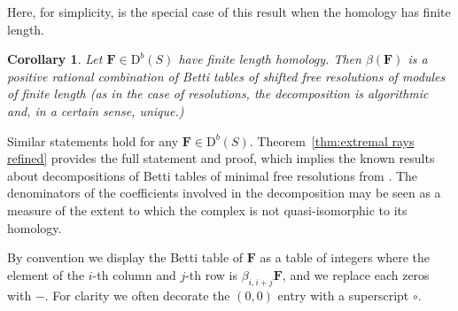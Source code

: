 \documentclass[12pt]{amsart}
\newtheorem{cor}[lemma]{Corollary}
\theoremstyle{definition}
\theoremstyle{remark}
\newcommand{\codim}{\operatorname{codim}}
\newcommand{\FF}{\mathbf{F}}
\newcommand{\DD}{\mathrm{D}}
\begin{document}
Here, for simplicity, is the special case of this result when the homology has finite length. 
%
\begin{cor}\label{cor:decompose}
Let $\FF\in \DD^b(S)$ have finite length homology.  Then $\beta(\FF)$ is a positive rational combination of Betti tables of shifted free resolutions of modules of finite length (as in the case of resolutions, the decomposition is algorithmic and, in a certain sense, unique.)
\end{cor}

Similar statements hold for any $\FF\in \DD^b(S)$.  Theorem~\ref{thm:extremal rays refined} provides the full statement and proof, which implies the known results about decompositions of Betti tables
of minimal free resolutions from \cites{eis-schrey1,boij-sod2}.
The denominators of the coefficients involved in the decomposition may be seen as a measure of the extent to which the complex is not quasi-isomorphic to its homology. 

By convention we display the Betti table of $\FF$ as a table
of integers where the element of the $i$-th column and $j$-th row is $\beta_{i,i+j}\FF$, and we replace each zeros with $-$. For clarity we often decorate the $(0,0)$ entry
with a superscript $\circ$.
\end{document}
